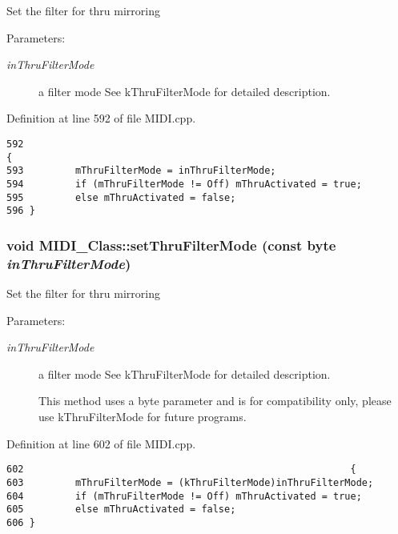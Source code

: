 Set the filter for thru mirroring \begin{Desc}
\item[Parameters:]
\begin{description}
\item[{\em inThruFilterMode}]a filter mode See kThruFilterMode for detailed description. \end{description}
\end{Desc}


Definition at line 592 of file MIDI.cpp.

\begin{Code}\begin{verbatim}592                                                                    { 
593         mThruFilterMode = inThruFilterMode;
594         if (mThruFilterMode != Off) mThruActivated = true;
595         else mThruActivated = false;
596 }
\end{verbatim}
\end{Code}


\hypertarget{class_m_i_d_i___class_be50e76aa11dc7127bd28659c181ab77}{
\subsubsection[{setThruFilterMode}]{\setlength{\rightskip}{0pt plus 5cm}void MIDI\_\-Class::setThruFilterMode (const {\bf byte} {\em inThruFilterMode})}}
\label{class_m_i_d_i___class_be50e76aa11dc7127bd28659c181ab77}


Set the filter for thru mirroring \begin{Desc}
\item[Parameters:]
\begin{description}
\item[{\em inThruFilterMode}]a filter mode See kThruFilterMode for detailed description. \par
 This method uses a byte parameter and is for compatibility only, please use kThruFilterMode for future programs. \end{description}
\end{Desc}


Definition at line 602 of file MIDI.cpp.

\begin{Code}\begin{verbatim}602                                                         { 
603         mThruFilterMode = (kThruFilterMode)inThruFilterMode;
604         if (mThruFilterMode != Off) mThruActivated = true;
605         else mThruActivated = false;
606 }
\end{verbatim}
\end{Code}


